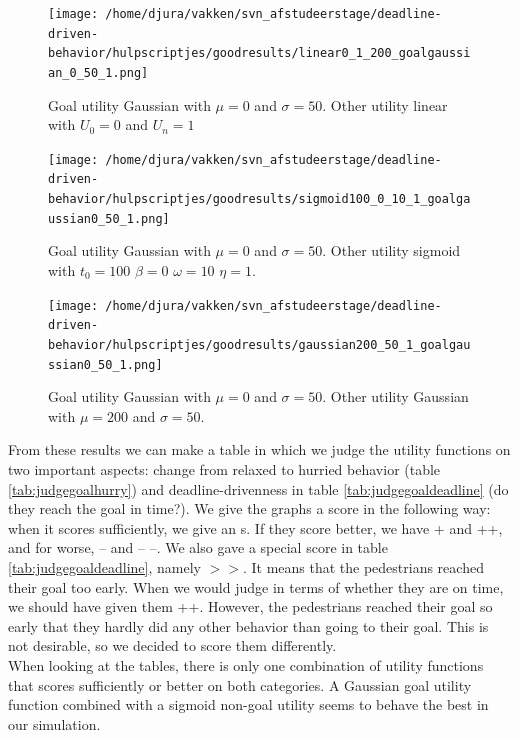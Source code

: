 \documentclass[11pt]{book}
\begin{document}
\begin{figure}[h]
\centering
\texttt{[image: /home/djura/vakken/svn\_afstudeerstage/deadline-driven-behavior/hulpscriptjes/goodresults/linear0\_1\_200\_goalgaussian\_0\_50\_1.png]}
\caption{Goal utility Gaussian with $\mu=0$ and $\sigma=50$. Other utility linear with $U_0=0$ and $U_n=1$}
\label{fig:linear0_1_200_goalgaussian_0_50_1}
\end{figure}

\begin{figure}[h]
\centering
\texttt{[image: /home/djura/vakken/svn\_afstudeerstage/deadline-driven-behavior/hulpscriptjes/goodresults/sigmoid100\_0\_10\_1\_goalgaussian0\_50\_1.png]}
\caption{Goal utility Gaussian with $\mu=0$ and $\sigma=50$. Other utility sigmoid with $t_0=100$ $\beta=0$ $\omega=10$ $\eta=1$.}
\label{fig:sigmoid100_0_10_1_goalgaussian0_50_1}
\end{figure}

\begin{figure}[h]
\centering
\texttt{[image: /home/djura/vakken/svn\_afstudeerstage/deadline-driven-behavior/hulpscriptjes/goodresults/gaussian200\_50\_1\_goalgaussian0\_50\_1.png]}
\caption{Goal utility Gaussian with $\mu=0$ and $\sigma=50$. Other utility Gaussian with $\mu=200$ and $\sigma=50$.}
\label{fig:gaussian200_50_1_goalgaussian0_50_1}
\end{figure}
\clearpage

From these results we can make a table in which we judge the utility functions on two important aspects: change from relaxed to hurried behavior (table \ref{tab:judgegoalhurry}) and deadline-drivenness in table \ref{tab:judgegoaldeadline} (do they reach the goal in time?). We give the graphs a score in the following way: when it scores sufficiently, we give an s. If they score better, we have + and ++, and for worse, -- and -- --. We also gave a special score in table \ref{tab:judgegoaldeadline}, namely $>>$. It means that the pedestrians reached their goal too early. When we would judge in terms of whether they are on time, we should have given them ++. However, the pedestrians reached their goal so early that they hardly did any other behavior than going to their goal. This is not desirable, so we decided to score them differently.\\
When looking at the tables, there is only one combination of utility functions that scores sufficiently or better on both categories. A Gaussian goal utility function combined with a sigmoid non-goal utility seems to behave the best in our simulation.
\end{document}
